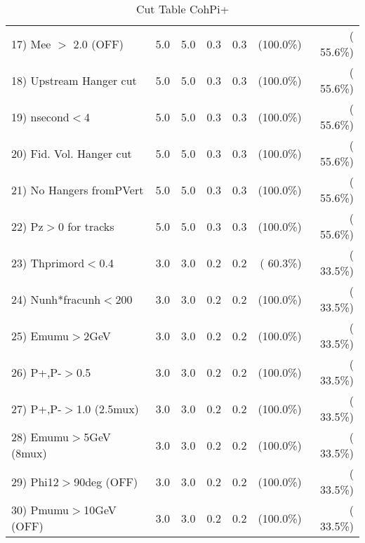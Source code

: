 \begin{table}[h!]
\begin{tabular}{||l||r|r|r|r|r|r||}
 17) Mee $>$ 2.0  (OFF)   &          5.0 &          5.0 &          0.3 &          0.3 & (100.0\%) & ( 55.6\%) \\
 18) Upstream Hanger cut  &          5.0 &          5.0 &          0.3 &          0.3 & (100.0\%) & ( 55.6\%) \\
 19) nsecond$<$4          &          5.0 &          5.0 &          0.3 &          0.3 & (100.0\%) & ( 55.6\%) \\
 20) Fid. Vol. Hanger cut &          5.0 &          5.0 &          0.3 &          0.3 & (100.0\%) & ( 55.6\%) \\
 21) No Hangers fromPVert &          5.0 &          5.0 &          0.3 &          0.3 & (100.0\%) & ( 55.6\%) \\
 22) Pz$>$0 for tracks    &          5.0 &          5.0 &          0.3 &          0.3 & (100.0\%) & ( 55.6\%) \\
 23) Thprimord$<$0.4      &          3.0 &          3.0 &          0.2 &          0.2 & ( 60.3\%) & ( 33.5\%) \\
 24) Nunh*fracunh$<$200   &          3.0 &          3.0 &          0.2 &          0.2 & (100.0\%) & ( 33.5\%) \\
 25) Emumu$>$2GeV         &          3.0 &          3.0 &          0.2 &          0.2 & (100.0\%) & ( 33.5\%) \\
 26) P+,P-$>$0.5          &          3.0 &          3.0 &          0.2 &          0.2 & (100.0\%) & ( 33.5\%) \\
 27) P+,P-$>$1.0 (2.5mux) &          3.0 &          3.0 &          0.2 &          0.2 & (100.0\%) & ( 33.5\%) \\
 28) Emumu$>$5GeV  (8mux) &          3.0 &          3.0 &          0.2 &          0.2 & (100.0\%) & ( 33.5\%) \\
 29) Phi12$>$90deg  (OFF) &          3.0 &          3.0 &          0.2 &          0.2 & (100.0\%) & ( 33.5\%) \\
 30) Pmumu$>$10GeV  (OFF) &          3.0 &          3.0 &          0.2 &          0.2 & (100.0\%) & ( 33.5\%) \\
 \hline
 \hline
 \end{tabular}
 \caption{Cut Table  CohPi+   }
 \label{tab-cutcohjpsi-mumu_nuecc}
 \end{table}
